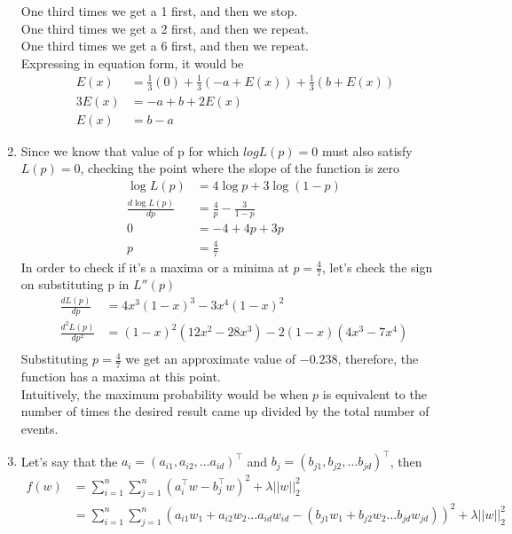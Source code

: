 \documentclass[12pt]{article}
\begin{document}
\begin{enumerate}[label=(\alph*)]
One third times we get a 1 first, and then we stop. \\
One third times we get a 2 first, and then we repeat. \\
One third times we get a 6 first, and then we repeat. \\
\linebreak
Expressing in equation form, it would be \\
\begin{equation*}\
\begin{split}
E(x) & = \frac{1}{3}(0) + \frac{1}{3}(-a + E(x)) + \frac{1}{3}(b + E(x)) \\
3 E(x) & = -a + b + 2E(x) \\
E(x) & = b-a
\end{split}
\end{equation*}
\linebreak
\item Since we know that value of p for which $log L(p) = 0$ must also satisfy $L(p) = 0$, checking the point where the slope of the function is zero  \\
\begin{equation*}
\begin{split}
\log L(p) & = 4\log p + 3\log (1-p)\\
\frac{d \log L(p)}{d p} & = \frac{4}{p} - \frac{3}{1-p}\\
0 & = - 4 + 4p + 3p\\
p & = \frac{4}{7}
\end{split}
\end{equation*}
In order to check if it's a maxima or a minima at $ p = \frac{4}{7}$, let's check the sign on substituting p in $L''(p)$ \\
\begin{equation*}
\begin{split}
\frac{d L(p)}{d p} & = 4x^3(1-x)^3 - 3x^4(1-x)^2 \\
\frac{d^2 L(p)}{d p^2} & = (1-x)^2(12x^2 - 28x^3) - 2(1-x)(4x^3 - 7x^4) \\
\end{split}
\end{equation*}
Substituting $p= \frac{4}{7}$ we get an approximate value of $-0.238$, therefore, the function has a maxima at this point.\\
Intuitively, the maximum probability would be when $p$ is equivalent to the number of times the desired result came up divided by the total number of events. \\
\linebreak
\item Let's say that the $a_i = (a_{i1}, a_{i2}, \dots a_{id})^\top$ and $b_j = (b_{j1}, b_{j2}, \dots b_{jd})^\top$, then
\begin{align*}
f(w) & = \sum_{i=1}^{n}\sum_{j=1}^{n} (a_i^\top w - b_j^\top w)^2 + \lambda||w||_2^2 \\
& = \sum_{i=1}^{n}\sum_{j=1}^{n} (a_{i1}w_1 + a_{i2}w_2 \dots a_{id}w_{id} - (b_{j1}w_1 + b_{j2}w_2 \dots b_{jd}w_{jd}))^2 + \lambda||w||_2^2
\end{align*}


\end{enumerate}
\end{document}
